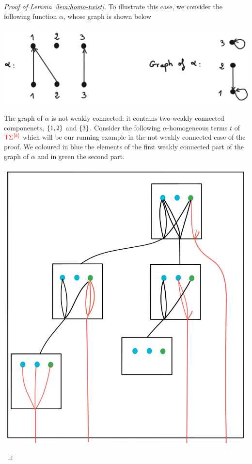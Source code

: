 \begin{proof}[Proof of Lemma~\ref{lem:homo-twist}]
\smallskip
To illustrate this case, we consider the following function $\alpha$, whose graph is shown below
\begin{center}
\includegraphics[scale=.07]{MyPic27.jpg}
\end{center}
The graph of $\alpha$ is not weakly connected: it contains two weakly connected componenets, $\{1,2\}$ and $\{3\}$.
Consider the following $\alpha$-homogeneous terms $t$ of ${\color{red}{\mathsf T}} {\color{red}{\Sigma}}^{{\color{red}{[k]}}}$ which will be our running example in the not weakly connected case of the proof. We coloured in blue the elements of the first weakly connected part of the graph of $\alpha$ and in green the second part.
\begin{center}
\includegraphics[scale=.07]{MyPic28.jpg}
\end{center}

\end{proof}
